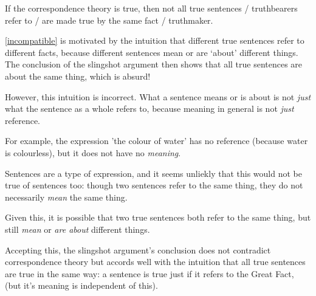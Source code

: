	\begin{thesis} \label{incompatible}
	If the correspondence theory is true, then not all true sentences / truthbearers refer to / are made true by the same fact / truthmaker.
	\end{thesis}

\ref{incompatible} is motivated by the intuition that different true sentences refer to different facts, because different sentences mean or are `about' different things.
The conclusion of the slingshot argument then shows that all true sentences are about the same thing, which is absurd!

However, this intuition is incorrect.
What a sentence means or is about is not \emph{just} what the sentence as a whole refers to, because meaning in general is not \emph{just} reference.

For example, the expression 'the colour of water' has no reference (because water is colourless), but it does not have no \emph{meaning}.

Sentences are a type of expression, and it seems unliekly that this would not be true of sentences too: though two sentences refer to the same thing, they do not necessarily \emph{mean} the same thing.

Given this, it is possible that two true sentences both refer to the same thing, but still \emph{mean} or \emph{are about} different things.

Accepting this, the slingshot argument's conclusion does not contradict correspondence theory but accords well with the intuition that all true sentences are true in the same way: a sentence is true just if it refers to the Great Fact, (but it's meaning is independent of this).
